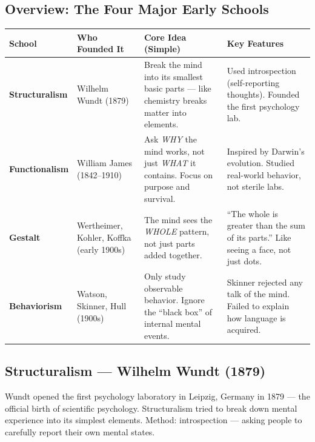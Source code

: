 \documentclass[11pt,a4paper]{article}
\newcommand{\bb}[1]{\textbf{#1}}
\begin{document}
\subsection*{Overview: The Four Major Early Schools}

\begin{center}
\renewcommand{\arraystretch}{1.4}
\begin{tabular}{|L{2.8cm}|L{3cm}|L{4.5cm}|L{4.5cm}|}
\hline
{}\color{white}\bb{School} & \color{white}\bb{Who Founded It} & \color{white}\bb{Core Idea (Simple)} & \color{white}\bb{Key Features} \\
\hline
\bb{Structuralism} & Wilhelm Wundt (1879) & Break the mind into its smallest basic parts --- like chemistry breaks matter into elements. & Used introspection (self-reporting thoughts). Founded the first psychology lab. \\
\bb{Functionalism} & William James (1842--1910) & Ask \textit{WHY} the mind works, not just \textit{WHAT} it contains. Focus on purpose and survival. & Inspired by Darwin's evolution. Studied real-world behavior, not sterile labs. \\
\bb{Gestalt} & Wertheimer, Kohler, Koffka (early 1900s) & The mind sees the \textit{WHOLE} pattern, not just parts added together. & ``The whole is greater than the sum of its parts.'' Like seeing a face, not just dots. \\
\bb{Behaviorism} & Watson, Skinner, Hull (1900s) & Only study observable behavior. Ignore the ``black box'' of internal mental events. & Skinner rejected any talk of the mind. Failed to explain how language is acquired. \\
\hline
\end{tabular}
\end{center}

\subsection*{Structuralism --- Wilhelm Wundt (1879)}

Wundt opened the first psychology laboratory in Leipzig, Germany in 1879 --- the official birth of scientific psychology. Structuralism tried to break down mental experience into its simplest elements. Method: introspection --- asking people to carefully report their own mental states.
\end{document}
